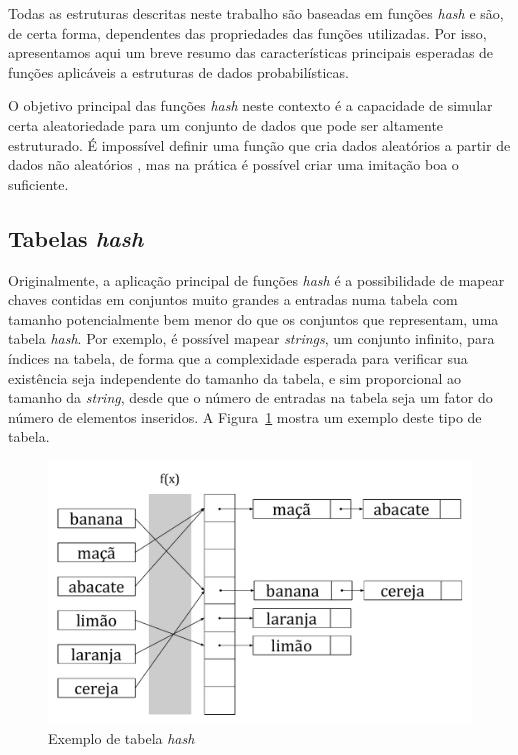 Todas as estruturas descritas neste trabalho são baseadas em funções \emph{hash} e são, de certa forma, dependentes das propriedades das funções utilizadas. Por isso, apresentamos aqui um breve resumo das características principais esperadas de funções aplicáveis a estruturas de dados probabilísticas.

O objetivo principal das funções \emph{hash} neste contexto é a capacidade de simular certa aleatoriedade para um conjunto de dados que pode ser altamente estruturado. É impossível definir uma função que cria dados aleatórios a partir de dados não aleatórios \cite{knuth1998art}, mas na prática é possível criar uma imitação boa o suficiente.

\subsection{Tabelas \emph{hash}}

Originalmente, a aplicação principal de funções \emph{hash} é a possibilidade de mapear chaves contidas em conjuntos muito grandes a entradas numa tabela com tamanho potencialmente bem menor do que os conjuntos que representam, uma tabela \emph{hash}. Por exemplo, é possível mapear \emph{strings}, um conjunto infinito, para índices na tabela, de forma que a complexidade esperada para verificar sua existência seja independente do tamanho da tabela, e sim proporcional ao tamanho da \emph{string}, desde que o número de entradas na tabela seja um fator do número de elementos inseridos. A Figura~\ref{fig:hashtable} mostra um exemplo deste tipo de tabela.

\begin{figure}[!htbp]
  \centering
  \includegraphics[scale=0.5]{figures/hashtable.pdf}
  \caption{Exemplo de tabela \emph{hash}}
  \label{fig:hashtable}
\end{figure}

